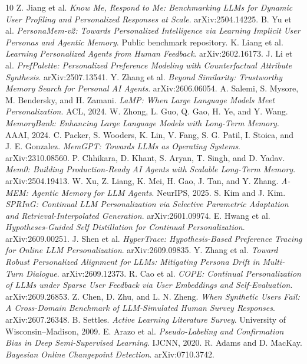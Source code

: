 \documentclass[10pt,twocolumn]{article}
\begin{document}
\begin{thebibliography}{10}\small
{} Z. Jiang et al. \emph{Know Me, Respond to Me: Benchmarking LLMs for Dynamic User Profiling and Personalized Responses at Scale}. arXiv:2504.14225.
 B. Yu et al. \emph{PersonaMem-v2: Towards Personalized Intelligence via Learning Implicit User Personas and Agentic Memory}. Public benchmark repository.
 K. Liang et al. \emph{Learning Personalized Agents from Human Feedback}. arXiv:2602.16173.
 J. Li et al. \emph{PrefPalette: Personalized Preference Modeling with Counterfactual Attribute Synthesis}. arXiv:2507.13541.
 Y. Zhang et al. \emph{Beyond Similarity: Trustworthy Memory Search for Personal AI Agents}. arXiv:2606.06054.
 A. Salemi, S. Mysore, M. Bendersky, and H. Zamani. \emph{LaMP: When Large Language Models Meet Personalization}. ACL, 2024.
 W. Zhong, L. Guo, Q. Gao, H. Ye, and Y. Wang. \emph{MemoryBank: Enhancing Large Language Models with Long-Term Memory}. AAAI, 2024.
 C. Packer, S. Wooders, K. Lin, V. Fang, S. G. Patil, I. Stoica, and J. E. Gonzalez. \emph{MemGPT: Towards LLMs as Operating Systems}. arXiv:2310.08560.
 P. Chhikara, D. Khant, S. Aryan, T. Singh, and D. Yadav. \emph{Mem0: Building Production-Ready AI Agents with Scalable Long-Term Memory}. arXiv:2504.19413.
 W. Xu, Z. Liang, K. Mei, H. Gao, J. Tan, and Y. Zhang. \emph{A-MEM: Agentic Memory for LLM Agents}. NeurIPS, 2025.
 S. Kim and J. Kim. \emph{SPRInG: Continual LLM Personalization via Selective Parametric Adaptation and Retrieval-Interpolated Generation}. arXiv:2601.09974.
 E. Hwang et al. \emph{Hypotheses-Guided Self Distillation for Continual Personalization}. arXiv:2609.00251.
 J. Shen et al. \emph{HyperTrace: Hypothesis-Based Preference Tracing for Online LLM Personalization}. arXiv:2609.09835.
 Y. Zhang et al. \emph{Toward Robust Personalized Alignment for LLMs: Mitigating Persona Drift in Multi-Turn Dialogue}. arXiv:2609.12373.
 R. Cao et al. \emph{COPE: Continual Personalization of LLMs under Sparse User Feedback via User Embeddings and Self-Evaluation}. arXiv:2609.26853.
 Z. Chen, D. Zhu, and L. N. Zheng. \emph{When Synthetic Users Fail: A Cross-Domain Benchmark of LLM-Simulated Human Survey Responses}. arXiv:2607.26348.
 B. Settles. \emph{Active Learning Literature Survey}. University of Wisconsin--Madison, 2009.
 E. Arazo et al. \emph{Pseudo-Labeling and Confirmation Bias in Deep Semi-Supervised Learning}. IJCNN, 2020.
 R. Adams and D. MacKay. \emph{Bayesian Online Changepoint Detection}. arXiv:0710.3742.
\end{thebibliography}
\end{document}
